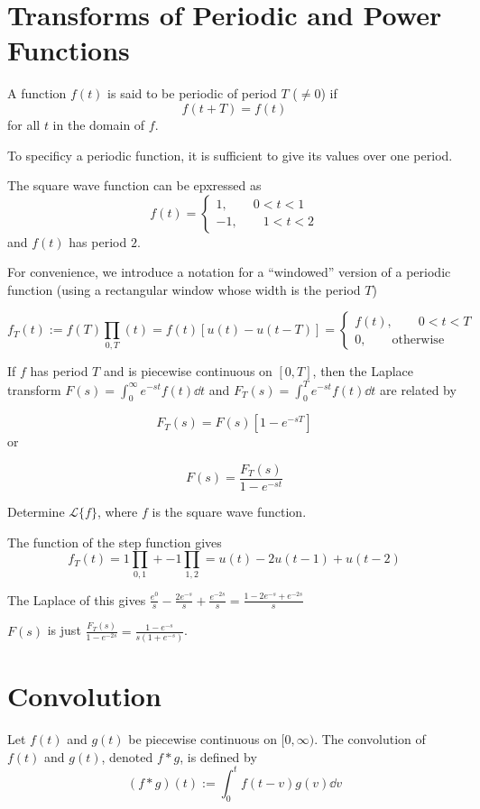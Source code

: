 \documentclass[../diffeq.tex]{subfiles}
\begin{document}
\section{Transforms of Periodic and Power Functions}
\begin{definition}
    A function $f(t)$ is said to be periodic of period $T$ ($\neq 0$) if 
    \[ f(t+T)=f(t) \]
    for all $t$ in the domain of $f$.
\end{definition}

To specificy a periodic function, it is sufficient to give its values over one period.

The square wave function can be epxressed as 
\[ f(t) = \begin{cases}
    1, \qquad 0<t<1 \\
    -1, \qquad 1<t<2 
\end{cases} \]
and $f(t)$ has period $2$.

For convenience, we introduce a notation for a ``windowed'' version of a periodic function (using a rectangular window whose width is the period $T$)

\[ f_T(t) := f(T)\prod_{0,T}(t)=f(t)[u(t)-u(t-T)]=\begin{cases}
    f(t),\qquad 0<t<T\\
    0, \qquad \text{otherwise}
\end{cases}\] 
\pagebreak
\begin{theorem}
    If $f$ has period $T$ and is piecewise continuous on $[0,T]$, then the Laplace transform $F(s)=\int_0^{\infty} e^{-st}f(t)\dd t$ and 
    $F_T(s)=\int_0^T e^{-st}f(t)\dd t$ are related by 

    \[ F_T(s)=F(s)[1-e^{-sT}] \] or 


    \[ F(s)=\frac{F_T(s)}{1-e^{-st}}\] 
\end{theorem}

\begin{example}
    Determine $\mathcal{L}\{f\}$, where $f$ is the square wave function.

    The function of the step function gives 
    \[ f_T(t)=1\prod_{0,1}+-1\prod_{1,2}=u(t)-2u(t-1)+u(t-2) \]

    The Laplace of this gives $\frac{e^0}{s}-\frac{2e^{-s}}{s}+\frac{e^{-2s}}{s} = \frac{1-2e^{-s}+e^{-2s}}{s}$

    $F(s)$ is just $\frac{F_T(s)}{1-e^{-2s}} = \frac{1-e^{-s}}{s(1+e^{-s})}$.
\end{example}

\section{Convolution}
\begin{definition}
    Let $f(t)$ and $g(t)$ be piecewise continuous on $[0,\infty)$. The convolution of $f(t)$ and $g(t)$, denoted $f \ast g$, is defined by 
    \[ (f\ast g)(t) := \int_0^t f(t-v)g(v)\dd v \]
\end{definition}
\end{document}
